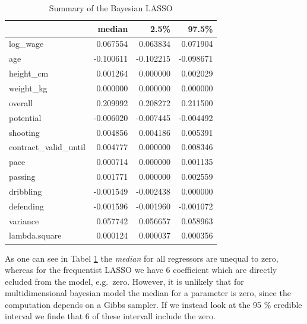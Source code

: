 \documentclass[12pt,a4paper]{article}
\begin{document}
\begin{table}

\caption{\label{tab:unnamed-chunk-5}\label{tab:sum_bay} Summary of the Bayesian LASSO }
\centering
\begin{tabular}[t]{lrrr}
\toprule
  & median & 2.5\% & 97.5\%\\
\midrule
\rowcolor{gray!6}  log\_wage & 0.067554 & 0.063834 & 0.071904\\
age & -0.100611 & -0.102215 & -0.098671\\
\rowcolor{gray!6}  height\_cm & 0.001264 & 0.000000 & 0.002029\\
weight\_kg & 0.000000 & 0.000000 & 0.000000\\
\rowcolor{gray!6}  overall & 0.209992 & 0.208272 & 0.211500\\
potential & -0.006020 & -0.007445 & -0.004492\\
\rowcolor{gray!6}  shooting & 0.004856 & 0.004186 & 0.005391\\
contract\_valid\_until & 0.004777 & 0.000000 & 0.008346\\
\rowcolor{gray!6}  pace & 0.000714 & 0.000000 & 0.001135\\
passing & 0.001771 & 0.000000 & 0.002559\\
\rowcolor{gray!6}  dribbling & -0.001549 & -0.002438 & 0.000000\\
defending & -0.001596 & -0.001960 & -0.001072\\
\rowcolor{gray!6}  variance & 0.057742 & 0.056657 & 0.058963\\
lambda.square & 0.000124 & 0.000037 & 0.000356\\
\bottomrule
\end{tabular}
\end{table}

As one can see in Tabel \ref{tab:sum_bay} the \emph{median} for all
regressors are unequal to zero, whereas for the frequentist \ac{LASSO}
we have 6 coefficient which are directly ecluded from the model,
e.g.~zero. However, it is unlikely that for multidimensional bayesian
model the median for a parameter is zero, since the computation depends
on a Gibbs sampler. If we instead look at the 95 \% credible interval we
finde that 6 of these intervall include the zero.
\end{document}
